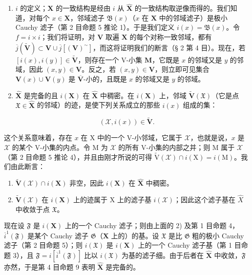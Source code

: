\begin{enumerate}
\def\labelenumi{\arabic{enumi})}
\setcounter{enumi}{1}
\item
  \(i\) 的定义；\(\mathbf{X}\) 的一致结构是经由 \(i\) 从 \(\hat{\mathbf{X}}\) 的一致结构取逆像而得的。我们知道，对每个 \(x \in \mathbf{X}\)，邻域滤子 \(\mathfrak{B}(x)\)（\(x\) 在 \(\mathbf{X}\) 中的邻域滤子）是极小 Cauchy 滤子（第 2 目命题 5 推论 1）。于是我们定义 \(i(x) = \mathfrak{B}(x)\)。令 \(f = i \times i\)；我们将证明，对 \(\mathbf{V}\) 取遍 \(\mathbf{X}\) 的每个对称一致邻域，都有 \(\overline{j}(\tilde{\mathbf{V}}) \subset \mathbf{V} \cup \overline{j}[(\mathbf{V})^{\sim}]\)，而这将证明我们的断言（§ 2 第 4 目）。现在，若 \([i(x), i(y)] \in \tilde{\mathbf{V}}\)，则存在一个 V-小集 \(\mathbf{M}\)，它既是 \(x\) 的邻域又是 \(y\) 的邻域，因此 \((x, y) \in \mathbf{V}\)。反之，若 \((x, y) \in \mathbf{V}\)，则立即可见集合 \(\mathbf{V}(x) \cup \mathbf{V}(y)\) 是 \(\overline{\mathbf{V}}\)-小的，且既是 \(x\) 的邻域又是 \(y\) 的邻域。
\item
  \(\hat{\mathbf{X}}\) 是完备的且 \(i(\mathbf{X})\) 在 \(\hat{\mathbf{X}}\) 中稠密。在 \(i(\mathbf{X})\) 上，邻域 \(\tilde{\mathbf{V}}(\mathfrak{X})\)（它是点 \(\mathfrak{X} \in \hat{\mathbf{X}}\) 的邻域）的迹，是使下列关系成立的那些 \(i(x)\) 组成的集：
\end{enumerate}

\[
(\mathcal {X}, i (x)) \in \tilde {\mathbf {V}}.
\]

这个关系意味着，存在 \(x\) 在 X 中的一个 V-小邻域，它属于 \(\mathcal{X}\)，也就是说，\(x\) 是 \(\mathcal{X}\) 的某个 V-小集的内点。令 M 为 \(\mathcal{X}\) 的所有 V-小集的内部之并；则 M 属于 \(\mathcal{X}\)（第 2 目命题 5 推论 4），并且由刚才所说的可得 \(\tilde{\mathrm{V}}(\mathcal{X}) \cap i(\mathrm{X}) = i(\mathrm{M})\)。我们由此断言：

\begin{enumerate}
\def\labelenumi{(\roman{enumi})}
\item
  \(\tilde{\mathbf{V}}(\mathcal{X}) \cap i(\mathbf{X})\) 非空，因此 \(i(\mathbf{X})\) 在 \(\hat{\mathbf{X}}\) 中稠密。
\item
  \(\tilde{\mathbf{V}}(\mathcal{X})\) 在 \(i(\mathbf{X})\) 上的迹属于 X 上的滤子基 \(i(\mathcal{X})\)；因此这个滤子基在 \(\hat{X}\) 中收敛于点 \(\mathfrak{X}\)。
\end{enumerate}

现在设 \(\mathfrak{F}\) 是 \(i(\mathbf{X})\) 上的一个 Cauchy 滤子；则由上面的 2) 及第 1 目命题 4，\(\overline{i}^{1}(\mathfrak{F})\) 是某个 Cauchy 滤子 \(\mathfrak{G}\)（\(\mathbf{X}\) 上的）的基。设 \(\mathfrak{X}\) 是比 \(\mathfrak{G}\) 粗的极小 Cauchy 滤子（第 2 目命题 5）；则 \(i(\mathfrak{X})\) 是 \(i(\mathbf{X})\) 上的一个 Cauchy 滤子基（第 1 目命题 3），且 \(\mathfrak{F}=i[\overline{i}^{1}(\mathfrak{F})]\) 比以 \(i(\mathfrak{X})\) 为基的滤子细。由于后者在 \(\hat{\mathbf{X}}\) 中收敛，\(\mathfrak{F}\) 亦然，于是第 4 目命题 9 表明 \(\hat{\mathbf{X}}\) 是完备的。


